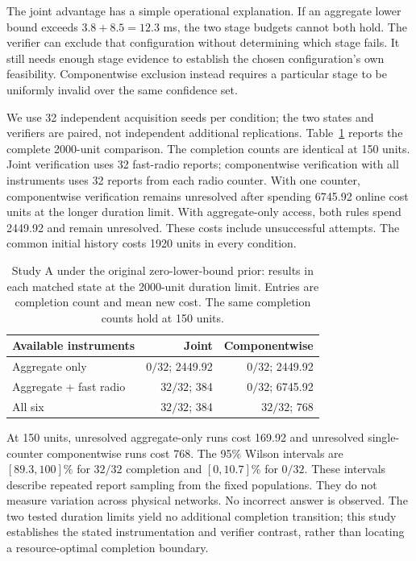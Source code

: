 The joint advantage has a simple operational explanation. If an aggregate
lower bound exceeds $3.8+8.5=12.3$ ms, the two stage budgets cannot both hold.
The verifier can exclude that configuration without determining which stage
fails. It still needs enough stage evidence to establish the chosen
configuration's own feasibility. Componentwise exclusion instead requires a
particular stage to be uniformly invalid over the same confidence set.

We use 32 independent acquisition seeds per condition; the two states and
verifiers are paired, not independent additional replications.
Table~\ref{tab:v41-capability} reports the complete 2000-unit comparison.
The completion counts are identical at 150 units. Joint verification uses
32 fast-radio reports; componentwise verification with all instruments uses
32 reports from each radio counter. With one counter, componentwise
verification remains unresolved after spending 6745.92 online cost units at
the longer duration limit. With aggregate-only access, both rules spend
2449.92 and remain unresolved. These costs include unsuccessful attempts.
The common initial history costs 1920 units in every condition.

\begin{table}[t]
\centering
\caption{Study A under the original zero-lower-bound prior: results in
each matched state at the 2000-unit duration limit. Entries are completion count and mean new cost.
The same completion counts hold at 150 units.}
\label{tab:v41-capability}
\small
\begin{tabular}{@{}lrr@{}}
\toprule
Available instruments & Joint & Componentwise\\
\midrule
Aggregate only & $0/32$; 2449.92 & $0/32$; 2449.92\\
Aggregate + fast radio & $32/32$; 384 & $0/32$; 6745.92\\
All six & $32/32$; 384 & $32/32$; 768\\
\bottomrule
\end{tabular}
\end{table}

At 150 units, unresolved aggregate-only runs cost 169.92 and unresolved
single-counter componentwise runs cost 768. The 95\% Wilson intervals are
$[89.3,100]\%$ for $32/32$ completion and $[0,10.7]\%$ for $0/32$.
These intervals describe repeated report sampling from the fixed populations.
They do not measure variation across physical networks. No incorrect answer
is observed. The two tested duration limits yield no additional completion
transition; this study establishes the stated instrumentation and verifier
contrast, rather than locating a resource-optimal completion boundary.

